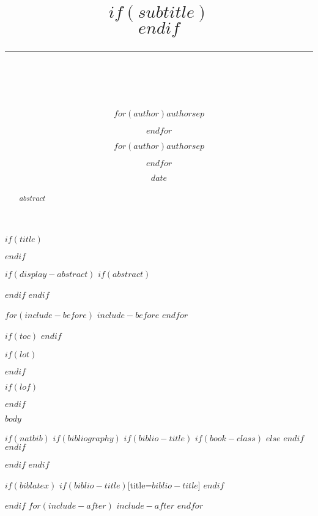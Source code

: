 \documentclass[$if(fontsize)$$fontsize$,$endif$$if(papersize)$$papersize$,$endif$$for(classoption)$$classoption$$sep$,$endfor$]{$documentclass$}
\title{\flushright {\textcolor{rule-color}{\rule{\textwidth}{2pt}}\vspace{0.4em}\\ \bf \huge $title$}$if(subtitle)$\\\vspace{0.2em}{\Large\textcolor{subtitle-color}{$subtitle$}}$endif$ \\ \vspace{-.4em} \textcolor{rule-color}{\rule{\textwidth}{2pt}} \\ \vspace{1.5em}}
\author{$for(author)$$author$$sep$ \and $endfor$}
\author{\bf $for(author)$$author$$sep$ \and $endfor$}
\affil{ \textit{$institute$} $if(contact)$\\ \vspace{1.0em} Contact: \href{mailto:$contact$}{$contact$}$endif$}
\date{$date$}
\renewcommand{\href}[2]{#2\footnote{\url{#1}}}
\begin{document}
\renewcommand{\labelitemi}{\(\bullet\)}
\renewcommand{\labelitemii}{\textendash}
\renewcommand{\labelitemiii}{\textasteriskcentered}
\renewcommand{\labelitemiii}{\textperiodcentered}




$if(title)$
{
 \thispagestyle{empty}
 \maketitle
}
$endif$

$if(display-abstract)$
$if(abstract)$
\begin{abstract}
  $abstract$
\end{abstract}
$endif$
$endif$

$for(include-before)$
$include-before$
$endfor$

$if(toc)$
{
  \setcounter{tocdepth}{$toc-depth$}
  \tableofcontents
  \newpage
}
$endif$

$if(lot)$
\listoftables
\newpage
$endif$

$if(lof)$
\listoffigures
\newpage
$endif$


$body$

$if(natbib)$
$if(bibliography)$
$if(biblio-title)$
$if(book-class)$
\renewcommand\bibname{$biblio-title$}
$else$
\renewcommand\refname{$biblio-title$}
$endif$
$endif$

$endif$
$endif$

$if(biblatex)$
\printbibliography$if(biblio-title)$[title=$biblio-title$]
$endif$

$endif$
$for(include-after)$
$include-after$
$endfor$
\end{document}
